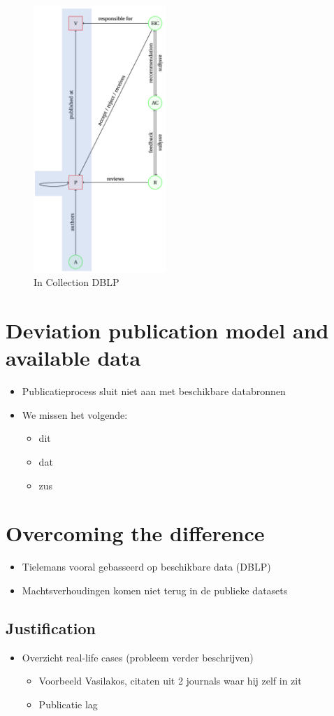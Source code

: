 \documentclass{ou-report}
\begin{document}
\begin{figure}[H]
\includegraphics[width=5cm]{incollection_aminer}
\centering
\caption{In Collection DBLP}
\end{figure}

\section{Deviation publication model and available data}
\begin{itemize}
    \item Publicatieprocess sluit niet aan met beschikbare databronnen
    \item We missen het volgende:
    \begin{itemize}
        \item dit
        \item dat
        \item zus
    \end{itemize}
\end{itemize}

\section{Overcoming the difference}
\begin{itemize}
    \item Tielemans vooral gebasseerd op beschikbare data (DBLP)
    \item Machtsverhoudingen komen niet terug in de publieke datasets
\end{itemize}
\subsection{Justification}
\begin{itemize}
    \item Overzicht real-life cases (probleem verder beschrijven)
    \begin{itemize}
        \item Voorbeeld Vasilakos, citaten uit 2 journals waar hij zelf in zit
        \item Publicatie lag
    \end{itemize}

\end{itemize}
\end{document}
